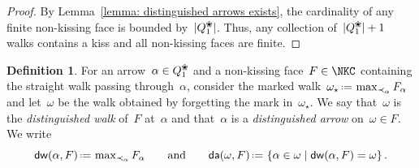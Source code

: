 \documentclass{amsart}
\theoremstyle{definition}
\newtheorem{definition}[theorem]{Definition}
\newcommand{\set}[2]{\left\{ #1 \;\middle|\; #2 \right\}} %
\newcommand{\eqdef}{\mbox{\,\raisebox{0.2ex}{\scriptsize\ensuremath{\mathrm:}}\ensuremath{=}\,}} %
\newcommand{\darkblue}{\color{darkblue}} %
\newcommand{\defn}[1]{\textsl{\darkblue #1}} %
\newcommand{\blossom}{^\text{\ding{96}}} %
\newcommand{\distinguishedWalk}[2]{\mathsf{dw}(#1,#2)} %
\newcommand{\distinguishedArrows}[2]{\mathsf{da}(#1,#2)} %
\begin{document}
\begin{proof}
By Lemma~\ref{lemma: distinguished arrows exists}, the cardinality of any finite non-kissing face is bounded by~$|Q_1\blossom|$.
Thus, any collection of~$|Q_1\blossom|+1$ walks contains a kiss and all non-kissing faces are finite.
\end{proof}

\begin{definition}
For an arrow~$\alpha \in Q\blossom_1$ and a non-kissing face~$F \in \NKC$ containing the straight walk passing through~$\alpha$, consider the marked walk~$\omega_\star \eqdef \max_{\prec_\alpha} F_\alpha$ and let~$\omega$ be the walk obtained by forgetting the mark in~$\omega_\star$. We say that~$\omega$ is the \defn{distinguished walk} of~$F$ at~$\alpha$ and that~$\alpha$ is a \defn{distinguished arrow} on~$\omega \in F$.
We write
\[
\distinguishedWalk{\alpha}{F} \eqdef \max\nolimits_{\prec_\alpha} F_\alpha
\qquad\text{and}\qquad
\distinguishedArrows{\omega}{F} \eqdef \set{\alpha \in \omega}{\distinguishedWalk{\alpha}{F} = \omega}.
\]
\end{definition}
\end{document}

